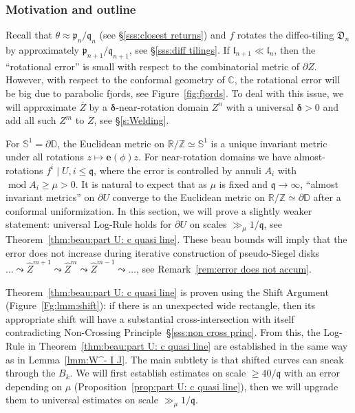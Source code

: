 \documentclass{amsart}
\newcommand{\1}{{\mathbb 1 }}
\newcommand{\epscasc}{{\mu}}
\newcommand{\wZ}{{\widehat Z}}
\newcommand{\pp}{\mathfrak{p}}
\newcommand{\ee}{\mathbf e}
\newcommand{\qq}{\mathfrak{q}}
\newcommand{\length}{{\mathfrak l}}
\newcommand{\C}{\mathbb{C}}
\newcommand{\R}{\mathbb{R}}
\newcommand{\Z}{\mathbb{Z}}
\newcommand{\Circle}{\mathbb{S}^1}
\newcommand{\Disk}{\mathbb{D}}
\newcommand{\Dbb}{{\mathfrak{D}}}
\theoremstyle{remark}
\numberwithin{equation}{section}
\theoremstyle{definition}
\renewcommand{\mod}{\operatorname{mod}}
\newcommand{\bdelta}{{\boldsymbol{ \delta}}}
\begin{document}
\subsubsection{Motivation and outline} 
\label{sss:outline:s:NearRotatSystem}
Recall that $\theta\approx \pp_n/\qq_n$ (see \S\ref{sss:closest returns}) and $f$ rotates the diffeo-tiling $\Dbb_n$ by approximately $\pp_{n+1}/\qq_{n+1}$, see \S\ref{sss:diff tilings}. If $\length_{n+1}\ll \length_n$, then the ``rotational error'' is small with respect to the combinatorial metric of $\partial Z$.  However, with respect to the conformal geometry of $\C$, the rotational error will be big due to parabolic fjords, see Figure~\ref{fig:fjords}. To deal with this issue, we will approximate $\overline Z$ by a $\bdelta$-near-rotation domain $Z^n$ with a universal $\bdelta>0$ and add all such $Z^m$ to $\overline Z$, see \S\ref{s:Welding}. 



For $\Circle=\partial \Disk$, the Euclidean metric on $\R/\Z\simeq \Circle$ is a unique invariant metric under all rotations $z\mapsto \ee(\phi)z$. For near-rotation domains we have  almost-rotations $f^i\mid U, i \le\qq$, where the error is controlled by annuli $A_i$ with $\mod A_i\ge \epscasc>0$. It is natural to expect that as $\epscasc$ is fixed and $\qq\to \infty$, ``almost invariant metrics'' on $\partial U$ converge to the Euclidean metric on $\R/\Z\simeq \partial \Disk$ after a conformal uniformization. In this section, we will prove a slightly weaker statement: universal Log-Rule holds for $\partial U$ on scales $\gg_{\mu} 1/\qq$,  see Theorem~\ref{thm:beau:part U: c quasi line}. These beau bounds will imply that the error does not increase during iterative construction of pseudo-Siegel disks $\dots \leadsto\wZ^{m+1}\leadsto \wZ^{m} \leadsto\wZ^{m-1}\leadsto\dots$, see Remark~\ref{rem:error does not accum}.


 Theorem~\ref{thm:beau:part U: c quasi line} is proven using the Shift Argument (Figure~\ref{Fg:lmm:shift}): if there is an unexpected wide rectangle, then its appropriate shift will have a substantial cross-intersection with itself contradicting Non-Crossing Principle~\S\ref{sss:non cross princ}. From this, the Log-Rule in Theorem~\ref{thm:beau:part U: c quasi line} are established in the same way as in Lemma~\ref{lmm:W^- I J}. The main subtlety is that shifted curves can sneak through the $B_k$. We will first establish estimates on scale $\ge 40/\qq$ with an error depending on $\epscasc$ (Proposition~\ref{prop:part U: c quasi line}), then we will upgrade them to universal estimates on scale $\gg_{\epscasc} 1/\qq$.
\end{document}
